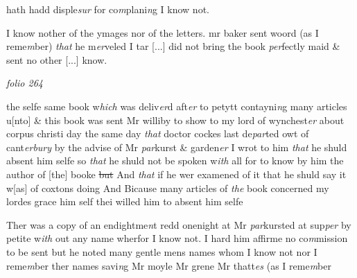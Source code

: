 \documentclass[12pt, a4paper]{book}
\begin{document}
               hath hadd disple\textit{sur} for co\textit{m}plani\textit{n}g I know not. 
			 
				\marginpar[\vspace{0.5cm}{\textcolor{Gray}{12}}]{}
			 I know nother of the ymages nor of the letters. 
				\marginpar[\vspace{0.5cm}{\textcolor{Gray}{13}}]{}
			 mr baker sent woord (as I reme\textit{m}ber) \textit{that} he m\textit{er}veled I tar
				[...]
			 did not bring the book \textit{per}fectly maid \& sent no other 
				[...]
			 know.

\dotfill
					

\textit{folio 264}



				\marginpar[\vspace{0.5cm}{\textcolor{Gray}{14}}]{}
			 the selfe same book w\textit{hich} was deliv\textit{er}d aft\textit{er} to petytt contayni\textit{n}g many articles u[nto] \& this book was sent Mr williby to show to my lord of wynchest\textit{er} about corpus christi day  
			 the same day \textit{that} doctor cockes last de\textit{par}ted owt of cant\textit{erbury} by the advise of Mr \textit{par}kurst \& garden\textit{er} I wrot to him \textit{that} he shuld absent him selfe so \textit{that} he shuld not be spoken w\textit{ith} all for to know by him the author of [the] booke \sout{but }And \textit{that} if he wer examened of it that he shuld say it w[as] of coxtons doing And 
				\marginpar[\vspace{0.5cm}{\textcolor{Gray}{15.}}]{}
			 Bicause many articles of \textit{the} book concerned my lordes grace him self thei willed him to absent him selfe
			 
				\marginpar[\vspace{0.5cm}{\textcolor{Gray}{16.}}]{}
			 Ther was a copy of an endightme\textit{n}t redd onenight at Mr \textit{par}kursted at sup\textit{per} by petite w\textit{ith} out any name wherfor I know not.  
				\marginpar[\vspace{0.5cm}{\textcolor{Gray}{17. 18.}}]{}
			 I hard him affirme no co\textit{m}mission to be sent but he noted many gentle mens names whom I know not nor I reme\textit{m}ber ther names savi\textit{n}g Mr moyle Mr grene Mr thatt\textit{es} (as I reme\textit{m}ber
			 
\end{document}
